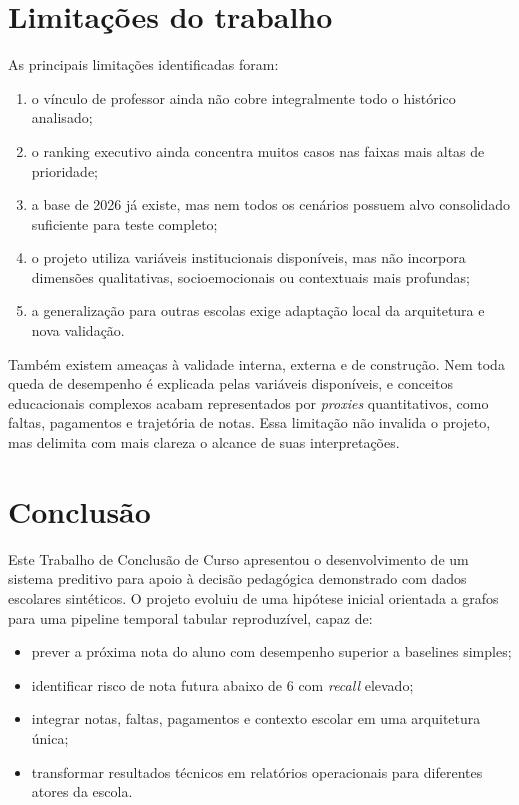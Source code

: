 \section{Limita\c{c}\~oes do trabalho}
\label{sec:limitacoes}

As principais limita\c{c}\~oes identificadas foram:
\begin{enumerate}
    \item o v\'inculo de professor ainda n\~ao cobre integralmente todo o hist\'orico analisado;
    \item o ranking executivo ainda concentra muitos casos nas faixas mais altas de prioridade;
    \item a base de 2026 j\'a existe, mas nem todos os cen\'arios possuem alvo consolidado suficiente para teste completo;
    \item o projeto utiliza vari\'aveis institucionais dispon\'iveis, mas n\~ao incorpora dimens\~oes qualitativas, socioemocionais ou contextuais mais profundas;
    \item a generaliza\c{c}\~ao para outras escolas exige adapta\c{c}\~ao local da arquitetura e nova valida\c{c}\~ao.
\end{enumerate}

Tamb\'em existem amea\c{c}as \`a validade interna, externa e de constru\c{c}\~ao. Nem toda queda de desempenho \'e explicada pelas vari\'aveis dispon\'iveis, e conceitos educacionais complexos acabam representados por \textit{proxies} quantitativos, como faltas, pagamentos e trajet\'oria de notas. Essa limita\c{c}\~ao n\~ao invalida o projeto, mas delimita com mais clareza o alcance de suas interpreta\c{c}\~oes.

\section{Conclus\~ao}
\label{sec:conclusao-final}

Este Trabalho de Conclus\~ao de Curso apresentou o desenvolvimento de um sistema preditivo para apoio \`a decis\~ao pedag\'ogica demonstrado com dados escolares sintéticos. O projeto evoluiu de uma hip\'otese inicial orientada a grafos para uma pipeline temporal tabular reproduz\'ivel, capaz de:
\begin{itemize}
    \item prever a pr\'oxima nota do aluno com desempenho superior a baselines simples;
    \item identificar risco de nota futura abaixo de 6 com \textit{recall} elevado;
    \item integrar notas, faltas, pagamentos e contexto escolar em uma arquitetura \'unica;
    \item transformar resultados t\'ecnicos em relat\'orios operacionais para diferentes atores da escola.
\end{itemize}


